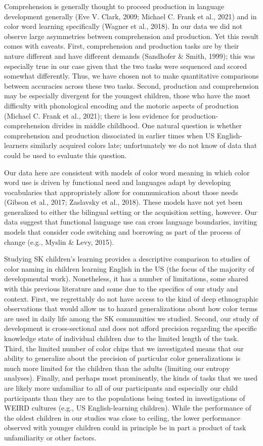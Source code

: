 \documentclass[
  english,
  ,apa7,floatsintext]{apa6}
\begin{document}
Comprehension is generally thought to proceed production in language development generally (Eve V. Clark, 2009; Michael C. Frank et al., 2021) and in color word learning specifically (Wagner et al., 2018). In our data we did not observe large asymmetries between comprehension and production. Yet this result comes with caveats. First, comprehension and production tasks are by their nature different and have different demands (Sandhofer \& Smith, 1999); this was especially true in our case given that the two tasks were sequenced and scored somewhat differently. Thus, we have chosen not to make quantitative comparisons between accuracies across these two tasks. Second, production and comprehension may be especially divergent for the youngest children, those who have the most difficulty with phonological encoding and the motoric aspects of production (Michael C. Frank et al., 2021); there is less evidence for production-comprehension divides in middle childhood. One natural question is whether comprehension and production dissociated in earlier times when US English-learners similarly acquired colors late; unfortunately we do not know of data that could be used to evaluate this question.

Our data here are consistent with models of color word meaning in which color word use is driven by functional need and languages adapt by developing vocabularies that appropriately allow for communication about those needs (Gibson et al., 2017; Zaslavsky et al., 2018). These models have not yet been generalized to either the bilingual setting or the acquisition setting, however. Our data suggest that functional language use can cross language boundaries, inviting models that consider code switching and borrowing as part of the process of change (e.g., Myslin \& Levy, 2015).

Studying SK children's learning provides a descriptive comparison to studies of color naming in children learning English in the US (the focus of the majority of developmental work). Nonetheless, it has a number of limitations, some shared with this previous literature and some due to the specifics of our study and context. First, we regrettably do not have access to the kind of deep ethnographic observations that would allow us to hazard generalizations about how color terms are used in daily life among the SK communities we studied. Second, our study of development is cross-sectional and does not afford precision regarding the specific knowledge state of individual children due to the limited length of the task. Third, the limited number of color chips that we investigated means that our ability to generalize about the precision of particular color generalizations is much more limited for the children than the adults (limiting our entropy analyses). Finally, and perhaps most prominently, the kinds of tasks that we used are likely more unfamiliar to all of our participants and especially our child participants than they are to the populations being tested in investigations of WEIRD cultures (e.g., US English-learning children). While the performance of the oldest children in our studies was close to ceiling, the lower performance observed with younger children could in principle be in part a product of task unfamiliarity or other factors.
\end{document}
